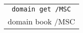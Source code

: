 {\tt
  \begin{tabular}{|l|}
    \hline \tt
    domain get /MSC  \\
    domain book /MSC \\
    \hline
  \end{tabular}
}
